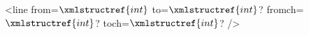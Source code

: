 <line from=$\xmlstructref{int}$ to=$\xmlstructref{int}$? fromch=$\xmlstructref{int}$? toch=$\xmlstructref{int}$? />

